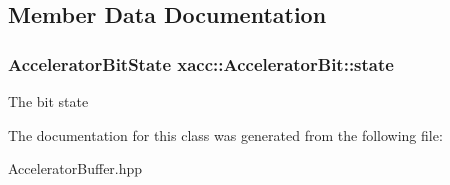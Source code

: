 \subsection{Member Data Documentation}
\subsubsection[{\texorpdfstring{state}{state}}]{\setlength{\rightskip}{0pt plus 5cm}Accelerator\+Bit\+State xacc\+::\+Accelerator\+Bit\+::state\hspace{0.3cm}{\ttfamily [protected]}}\hypertarget{a00012_a4632123ac31aeed0dc97c65f8c792a85}{}\label{a00012_a4632123ac31aeed0dc97c65f8c792a85}
The bit state 

The documentation for this class was generated from the following file\+:\begin{DoxyCompactItemize}
\item 
Accelerator\+Buffer.\+hpp\end{DoxyCompactItemize}
